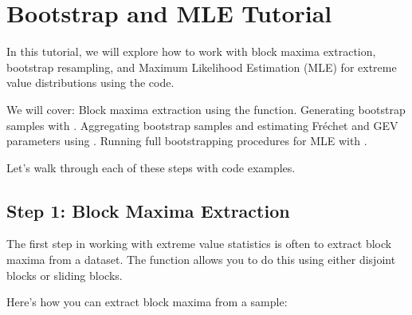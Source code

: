 \documentclass[a4paper,11pt,openany,english]{sphinxmanual}
\begin{document}
\sphinxstepscope


\chapter{Bootstrap and MLE Tutorial}
\label{\detokenize{bootstrap:bootstrap-and-mle-tutorial}}\label{\detokenize{bootstrap::doc}}
\sphinxAtStartPar
In this tutorial, we will explore how to work with block maxima extraction, bootstrap resampling, and Maximum Likelihood Estimation (MLE) for extreme value distributions using the  code.

\sphinxAtStartPar
We will cover:
\sphinxhyphen{} Block maxima extraction using the  function.
\sphinxhyphen{} Generating bootstrap samples with .
\sphinxhyphen{} Aggregating bootstrap samples and estimating Fréchet and GEV parameters using .
\sphinxhyphen{} Running full bootstrapping procedures for MLE with .

\sphinxAtStartPar
Let’s walk through each of these steps with code examples.


\section{Step 1: Block Maxima Extraction}
\label{\detokenize{bootstrap:step-1-block-maxima-extraction}}
\sphinxAtStartPar
The first step in working with extreme value statistics is often to extract block maxima from a dataset. The  function allows you to do this using either disjoint blocks or sliding blocks.

\sphinxAtStartPar
Here’s how you can extract block maxima from a sample:
\end{document}

